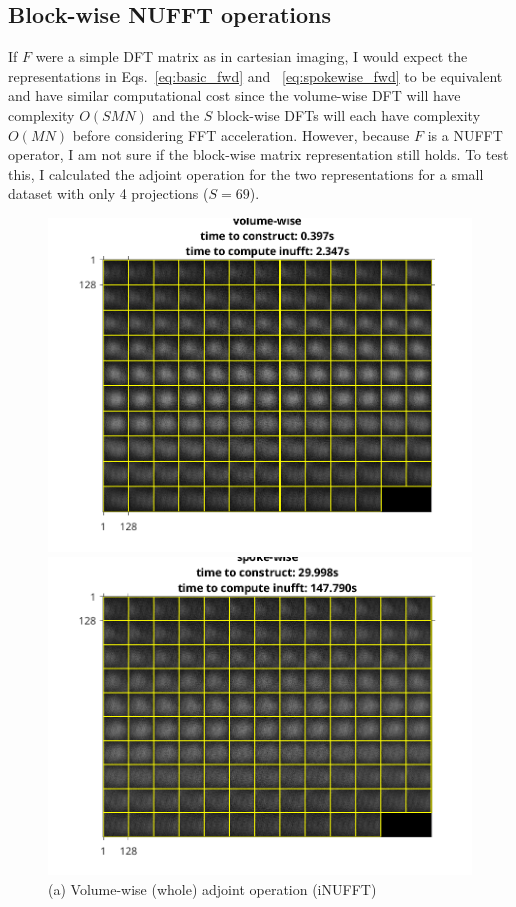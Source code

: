 \documentclass[11pt]{article}
\begin{document}
\subsection*{Block-wise NUFFT operations}
If $F$ were a simple DFT matrix as in cartesian imaging, I would expect the representations in Eqs.~\ref{eq:basic_fwd} and ~\ref{eq:spokewise_fwd}
to be equivalent and have similar computational cost since
the volume-wise DFT will have complexity $O(SMN)$ and the $S$ block-wise DFTs will each have complexity $O(MN)$
before considering FFT acceleration.
However, because $F$ is a NUFFT operator, I am not sure if the block-wise matrix representation still holds.
To test this, I calculated the adjoint operation for the two representations for a small dataset with only 4 projections ($S = 69$).
\begin{figure}[H]
  \centering
  \begin{minipage}{0.45\textwidth}
    \centering
    \includegraphics[width=\textwidth]{volume-wise_inufft.png}
    \caption*{(a) Volume-wise (whole) adjoint operation (iNUFFT)}
  \end{minipage}
  \hfill
  \begin{minipage}{0.45\textwidth}
    \centering
    \includegraphics[width=\textwidth]{spoke-wise_inufft.png}

\end{minipage}
\end{figure}
\end{document}
